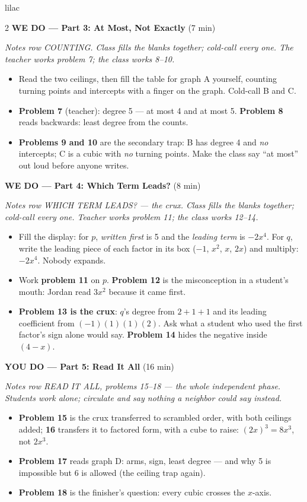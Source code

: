 \documentclass[10pt]{article}
\begin{document}
\begin{skillbox}{lilac}
\begin{multicols}{2}
\textbf{WE DO --- Part 3: At Most, Not Exactly} (7 min)

\textit{Notes row COUNTING. Class fills the blanks together; cold-call every one. The teacher
works problem 7; the class works 8--10.}
\begin{itemize}
  \item Read the two ceilings, then fill the table for graph A yourself, counting turning points
        and intercepts with a finger on the graph. Cold-call B and C.
  \item \textbf{Problem 7} (teacher): degree 5 --- at most 4 and at most 5.
        \textbf{Problem 8} reads backwards: least degree from the counts.
  \item \textbf{Problems 9 and 10} are the secondary trap: B has degree 4 and \emph{no}
        intercepts; C is a cubic with \emph{no} turning points. Make the class say ``at most''
        out loud before anyone writes.
\end{itemize}

\textbf{WE DO --- Part 4: Which Term Leads?} (8 min)

\textit{Notes row WHICH TERM LEADS? --- the crux. Class fills the blanks together; cold-call
every one. Teacher works problem 11; the class works 12--14.}
\begin{itemize}
  \item Fill the display: for $p$, \textit{written first} is 5 and the \textit{leading term}
        is $-2x^4$. For $q$, write the leading piece of each factor in its box ($-1$, $x^2$,
        $x$, $2x$) and multiply: $-2x^4$. Nobody expands.
  \item Work \textbf{problem 11} on $p$. \textbf{Problem 12} is the misconception in a
        student's mouth: Jordan read $3x^2$ because it came first.
  \item \textbf{Problem 13 is the crux}: $q$'s degree from $2 + 1 + 1$ and its leading
        coefficient from $(-1)(1)(1)(2)$. Ask what a student who used the first factor's
        sign alone would say. \textbf{Problem 14} hides the negative inside $(4 - x)$.
\end{itemize}

\textbf{YOU DO --- Part 5: Read It All} (16 min)

\textit{Notes row READ IT ALL, problems 15--18 --- the whole independent phase. Students work
alone; circulate and say nothing a neighbor could say instead.}
\begin{itemize}
  \item \textbf{Problem 15} is the crux transferred to scrambled order, with both ceilings
        added; \textbf{16} transfers it to factored form, with a cube to raise:
        $(2x)^3 = 8x^3$, not $2x^3$.
  \item \textbf{Problem 17} reads graph D: arms, sign, least degree --- and why 5 is
        impossible but 6 is allowed (the ceiling trap again).
  \item \textbf{Problem 18} is the finisher's question: every cubic crosses the $x$-axis.
\end{itemize}
\end{multicols}
\end{skillbox}
\end{document}
